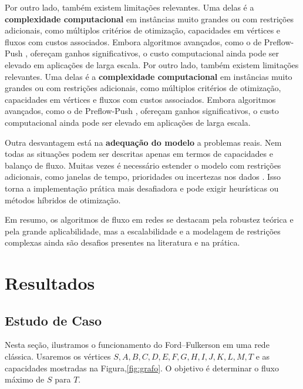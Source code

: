 \documentclass[12pt]{article}
\begin{document}
\noindent Por outro lado, também existem limitações relevantes. Uma delas é a \textbf{complexidade computacional} em instâncias muito grandes ou com restrições adicionais, como múltiplos critérios de otimização, capacidades em vértices e fluxos com custos associados. Embora algoritmos avançados, como o de Preflow-Push \cite{goldberg1988}, ofereçam ganhos significativos, o custo computacional ainda pode ser elevado em aplicações de larga escala. 
Por outro lado, também existem limitações relevantes. Uma delas é a \textbf{complexidade computacional} em instâncias muito grandes ou com restrições adicionais, como múltiplos critérios de otimização, capacidades em vértices e fluxos com custos associados. Embora algoritmos avançados, como o de Preflow-Push \cite{goldberg1988}, ofereçam ganhos significativos, o custo computacional ainda pode ser elevado em aplicações de larga escala. 

\noindent Outra desvantagem está na \textbf{adequação do modelo} a problemas reais. Nem todas as situações podem ser descritas apenas em termos de capacidades e balanço de fluxo. Muitas vezes é necessário estender o modelo com restrições adicionais, como janelas de tempo, prioridades ou incertezas nos dados \cite{ahuja1993,papadimitriou1998}. Isso torna a implementação prática mais desafiadora e pode exigir heurísticas ou métodos híbridos de otimização. 

\noindent Em resumo, os algoritmos de fluxo em redes se destacam pela robustez teórica e pela grande aplicabilidade, mas a escalabilidade e a modelagem de restrições complexas ainda são desafios presentes na literatura e na prática.





\section{Resultados}
\subsection{Estudo de Caso} \label{sec:implementacao} 

Nesta seção, ilustramos o funcionamento do Ford–Fulkerson em uma rede clássica. Usaremos os vértices ${S, A, B, C, D, E, F, G, H, I, J, K, L , M, T}$ e as capacidades mostradas na Figura,\ref{fig:grafo}. O objetivo é determinar o fluxo máximo de $S$ para $T$.\vskip1.5cm
\end{document}
